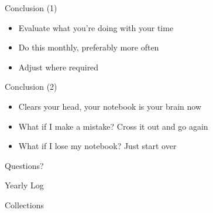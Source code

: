 \documentclass[aspectratio=169]{beamer}
\begin{document}
    {
    \begin{frame}{Conclusion (1)}
        \begin{itemize}
            \item Evaluate what you're doing with your time
            \item Do this monthly, preferably more often
            \item Adjust where required
        \end{itemize}
    \end{frame}
    }

    {
    \begin{frame}{Conclusion (2)}
        \begin{itemize}
            \item Clears your head, your notebook is your brain now
            \item What if I make a mistake? Cross it out and go again
            \item What if I lose my notebook? Just start over
        \end{itemize}
    \end{frame}
    }

    \begin{frame}[standout]
        Questions?
    \end{frame}

    \appendix

    \begin{frame}{Yearly Log}
    \end{frame}

    \begin{frame}{Collections}
    \end{frame}
\end{document}
